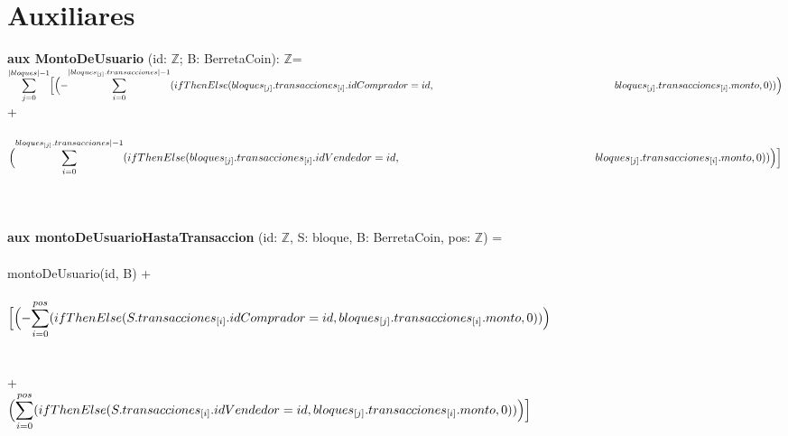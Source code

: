 \documentclass{article}
\newcommand{\Entero}{$\mathds{Z}$}
\begin{document}
\section*{Auxiliares}

{\selectfont\textbf{aux MontoDeUsuario} (id: \Entero; B: BerretaCoin): \Entero}=\\

        \indent\indent
        $\mathlarger\sum\limits_{j=0}^{|bloques| - 1}
        \Bigl[\Bigl(-\mathlarger\sum\limits_{i=0}^{|bloques_{[j]}.transacciones|-1} (ifThenElse (bloques_{[j]}.transacciones_{[i]}.idComprador = id,\\
        \indent\indent\indent\indent\indent\indent\indent\indent\indent\indent\indent\indent bloques_{[j]}.transacciones_{[i]}.monto, 0))\Bigr)$ \\

        \indent\indent\indent\indent\indent\indent\indent\indent+\\\\

        \indent\indent\indent\indent\indent
        $\Bigl(\mathlarger\sum\limits_{i=0}^{bloques_{[j]}.transacciones|-1} (ifThenElse (bloques_{[j]}.transacciones_{[i]}.idVendedor = id,\\
        \indent\indent\indent\indent\indent\indent\indent\indent\indent\indent\indent\indent bloques_{[j]}.transacciones_{[i]}.monto, 0))\Bigr)\Bigr]$\\\\\\\\

        {\selectfont\textbf{aux montoDeUsuarioHastaTransaccion} (id: \Entero, S: bloque, B: BerretaCoin, pos: \Entero)} =\\\\
        \indent\indent montoDeUsuario(id, B) +\\\\
        \indent\indent $\Bigl[\Bigl(-\mathlarger\sum\limits_{i=0}^{pos} (ifThenElse (S.transacciones_{[i]}.idComprador = id, bloques_{[j]}.transacciones_{[i]}.monto, 0))\Bigr)$\\\\\\
        \indent\indent\indent+\\

        \indent\indent $\Bigl(\mathlarger\sum\limits_{i=0}^{pos} (ifThenElse (S.transacciones_{[i]}.idVendedor = id, bloques_{[j]}.transacciones_{[i]}.monto, 0)) \Bigr)\Bigr]$\\\\\\\\
\end{document}
